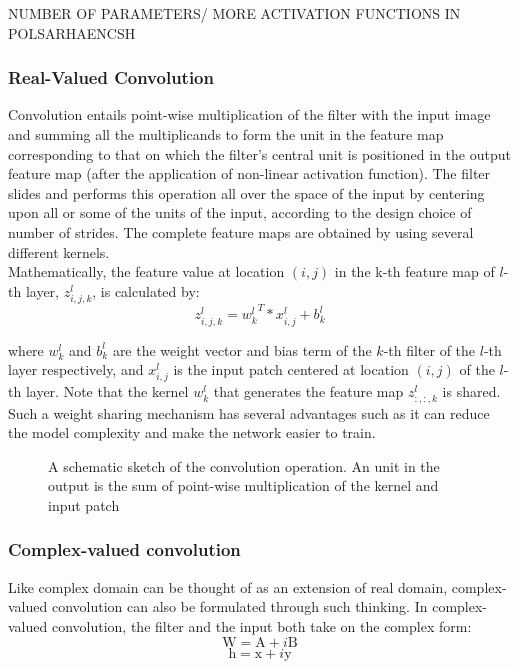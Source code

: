  NUMBER OF PARAMETERS/ MORE ACTIVATION FUNCTIONS IN POLSARHAENCSH
 
 \subsubsection{Real-Valued Convolution}
 Convolution entails point-wise multiplication of the filter with the input image and summing all the multiplicands to form the unit in the feature map corresponding to that on which the filter's central unit is positioned in the output feature map (after the application of non-linear activation function). The filter slides and performs this operation all over the space of the input by centering upon all or some of the units of the input, according to the design choice of number of strides. The complete feature maps are obtained by using several different kernels. \\
 
 Mathematically, the feature value at location $(i, j)$ in the k-th feature map of $l$-th layer, $z_{i,j,k}^l$, is calculated by:
 \begin{equation}
 z_{i,j,k}^l= {w_{k}^l}^T*x^l_{i,j} + b^l_k
 \end{equation}
 
 
 where $w_k^{l}$ and $b_k^{l}$ are the weight vector and bias term of the $k$-th filter of the $l$-th layer respectively, and
 $x^l_{i,j}$ is the input patch centered at location $(i, j)$ of the $l$-th layer. Note that the kernel $w_k^{l}$ that generates
 the feature map $z^l_{:,:,k}$ is shared. Such a weight sharing mechanism has several advantages such as it can reduce the model complexity and make the network easier to train\cite{recent_advances}. 
 
\begin{figure}[htb]
	\centering
	\epsfxsize=6cm
	{}
	\caption{A schematic sketch of the convolution operation. An unit in the output is the sum of point-wise multiplication of the kernel and input patch \cite{bloggg}}
	\label{fig:conv}
\end{figure}
 

\subsubsection{Complex-valued convolution}
Like complex domain can be thought of as an extension of real domain, complex-valued convolution can also be formulated through such thinking. In complex-valued convolution, the filter and the input both take on the complex form:
 \begin{equation}
\mathrm{W} = \mathrm{A}+i\mathrm{B}
\label{eqCfilter}
\end{equation}
 \begin{equation}
\mathrm{h} = \mathrm{x}+i\mathrm{y}
\label{eqCinput}
\end{equation}
 
